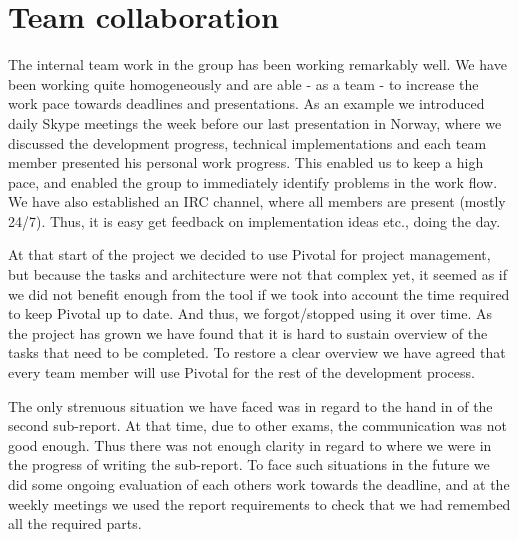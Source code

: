 \section{Team collaboration}
The internal team work in the group has been working remarkably well. We have been
working quite homogeneously and are able - as a team - to increase the work pace towards
deadlines and presentations. As an example we introduced daily Skype meetings
the week before our last presentation in Norway, where we discussed the
development progress, technical implementations and each team member presented his
personal work progress. This enabled us to keep a high pace, and enabled the
group to immediately identify problems in the work flow. We have also established
an IRC channel, where all members are present (mostly 24/7). Thus, it is easy
get feedback on implementation ideas etc., doing the day.

At that start of the project we decided to use Pivotal for project management,
but because the tasks and architecture were not that complex yet, it seemed
as if we did not benefit enough from the tool if we took into account the time
required to keep Pivotal up to date. And thus, we forgot/stopped using it over time.
As the project has grown we have found that it is hard to sustain overview of
the tasks that need to be completed. To restore a clear overview we have
agreed that every team member will use Pivotal for the rest of the development
process.

The only strenuous situation we have faced was in regard to the hand in of the
second sub-report. At that time, due to other exams, the communication was not
good enough. Thus there was not enough clarity in regard to where we were
in the progress of writing the sub-report. To face such situations in the future
we did some ongoing evaluation of each others work towards the
deadline, and at the weekly meetings we used the report requirements to
check that we had remembed all the required parts.



